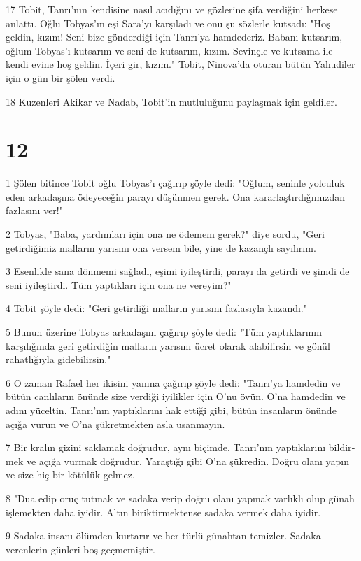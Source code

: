 \par 17 Tobit, Tanrı'nın kendisine nasıl acıdığını ve gözlerine şifa verdiğini herkese anlat­tı. Oğlu Tobyas'ın eşi Sara'yı karşıla­dı ve onu şu sözlerle kutsadı: "Hoş geldin, kızım! Seni bize gönderdiği için Tanrı'ya hamdederiz. Babanı kut­sarım, oğlum Tobyas'ı kutsarım ve seni de kutsarım, kızım. Sevinçle ve kutsama ile kendi evine hoş geldin. İçeri gir, kızım." Tobit, Ninova'da otu­ran bütün Yahudiler için o gün bir şö­len verdi.
\par 18 Kuzenleri Akikar ve Nadab, Tobit'in mutluluğunu paylaşmak için geldiler.

\chapter{12}

\par 1 Şölen bitince Tobit oğlu Tob­yas'ı çağırıp şöyle dedi: "Oğ­lum, seninle yolculuk eden arkadaşına ödeyeceğin parayı düşünmen gerek. Ona kararlaştırdığımızdan fazlasını ver!"
\par 2 Tobyas, "Baba, yardımları için ona ne ödemem gerek?" diye sordu, "Geri getirdiğimiz malların yarısını ona versem bile, yine de kazançlı sa­yılırım.
\par 3 Esenlikle sana dönmemi sağ­ladı, eşimi iyileştirdi, parayı da getirdi ve şimdi de seni iyileştirdi. Tüm yap­tıkları için ona ne vereyim?"
\par 4 Tobit şöyle dedi: "Geri getirdiği malların yarısını fazlasıyla kazandı."
\par 5 Bunun üzerine Tobyas arkadaşını çağırıp şöy­le dedi: "Tüm yaptıklarının karşılığın­da geri getirdiğin malların yarısını üc­ret olarak alabilirsin ve gönül rahatlı­ğıyla gidebilirsin."
\par 6 O zaman Rafael her ikisini yanı­na çağırıp şöyle dedi: "Tanrı'ya hamdedin ve bütün canlıların önünde size verdiği iyilikler için O'nu övün. O'na hamdedin ve adını yüceltin. Tanrı'nın yaptıklarını hak ettiği gibi, bütün insanların önünde açığa vurun ve O'na şükretmekten asla usanmayın.
\par 7 Bir kralın gizini saklamak doğrudur, aynı biçimde, Tanrı'nın yaptıklarını bildir­mek ve açığa vurmak doğrudur. Ya­raştığı gibi O'na şükredin. Doğru ola­nı yapın ve size hiç bir kötülük gel­mez.
\par 8 "Dua edip oruç tutmak ve sadaka verip doğru olanı yapmak varlıklı olup günah işlemekten daha iyidir. Altın biriktirmektense sadaka vermek daha iyidir.
\par 9 Sadaka insanı ölümden kurta­rır ve her türlü günahtan temizler. Sa­daka verenlerin günleri boş geçmemiştir.
